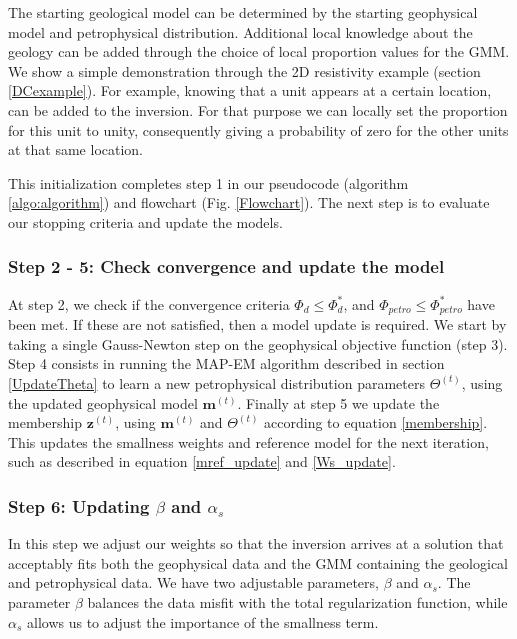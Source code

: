\documentclass[extra]{gji} %
\begin{document}
The starting geological model can be determined by the starting geophysical model and petrophysical distribution. Additional local knowledge about the geology can be added through the choice of local proportion values for the GMM. We show a simple demonstration through the 2D resistivity example (section \ref{DCexample}). For example, knowing that a unit appears at a certain location, can be added to the inversion. For that purpose we can locally set the proportion for this unit to unity, consequently giving a probability of zero for the other units at that same location.

This initialization completes step 1 in our pseudocode (algorithm \ref{algo:algorithm}) and flowchart (Fig. \ref{Flowchart}). The next step is to evaluate our stopping criteria and update the models.


\subsubsection{Step 2 - 5: Check convergence and update the model}

At step 2, we check if the convergence criteria $\Phi_d\leq\Phi_d^*$, and $\Phi_{petro}\leq\Phi_{petro}^*$ have been met. If these are not satisfied, then a model update is required. We start by taking a single Gauss-Newton step on the geophysical objective function \citep{NoceWrig06} (step 3).  Step 4 consists in running  the MAP-EM algorithm described in section \ref{UpdateTheta} to learn a new petrophysical distribution parameters $\Theta^{(t)}$, using the updated geophysical model $\mathbf{m}^{(t)}$. Finally at step 5 we update the membership $\mathbf{z}^{(t)}$, using $\mathbf{m}^{(t)}$ and $\Theta^{(t)}$ according to equation \ref{membership}. This updates the smallness weights and reference model for the next iteration, such as described in equation \ref{mref_update} and \ref{Ws_update}.


\subsubsection{Step 6: Updating $\beta$ and $\alpha_s$}

In this step we adjust our weights so that the inversion arrives at a solution that acceptably fits both the geophysical data and the GMM containing the geological and petrophysical data. We have two adjustable parameters, $\beta$ and $\alpha_s$. The parameter $\beta$ balances the data misfit with the total regularization function, while $\alpha_s$ allows us to adjust the importance of the smallness term.
\end{document}

